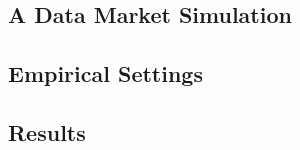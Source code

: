 


\subsection{A Data Market Simulation}\label{sec:sim}

\subsection{Empirical Settings}\label{sec:set}

\subsection{Results}\label{sec:res}